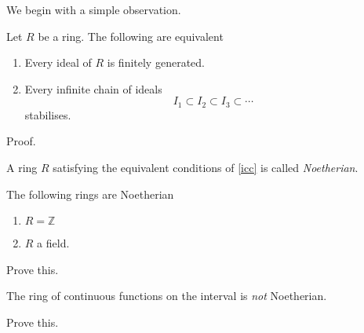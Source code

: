 \documentclass[11pt]{article}
\begin{document}
We begin with a simple observation.
\begin{proposition}
Let \(R\) be a ring. The following are equivalent
\begin{enumerate}
\item Every ideal of \(R\) is finitely generated.
\item Every infinite chain of ideals
\[I_1 \subset I_2 \subset I_3 \subset \cdots\]
stabilises.
\end{enumerate}
\label{icc}
\end{proposition}
\begin{skipped}
Proof.
\end{skipped}

\begin{definition}
A ring \(R\) satisfying the equivalent conditions of \ref{icc} is called \emph{Noetherian}.
\end{definition}

The following rings are Noetherian
\begin{enumerate}
\item \(R = {\mathbb Z}\)
\item \(R\) a field.
\end{enumerate}
\begin{skipped}
Prove this.
\end{skipped}

The ring of continuous functions on the interval is \emph{not} Noetherian.
\begin{skipped}
Prove this.
\end{skipped}
\end{document}
